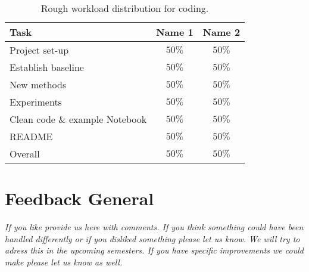 \documentclass[rebuttal]{cvpr}
\begin{document}
\begin{table}
	\begin{center}
		\begin{tabular}{l|c|c}
			
			Task & Name 1 & Name 2 \\
			\hline
			Project set-up & $50\%$ & $50\%$ \\
			Establish baseline & $50\%$ & $50\%$ \\
			New methods & $50\%$ & $50\%$ \\
			Experiments & $50\%$ & $50\%$ \\
			Clean code \& example Notebook & $50\%$ & $50\%$ \\
			README & $50\%$ & $50\%$ \\
			\hline
			\hline
			Overall &$50\%$ & $50\%$ \\
			
		\end{tabular}
	\end{center}
	\caption{Rough workload distribution for coding.}
\end{table}

\section{Feedback General}
\textit{If you like provide us here with comments. If you think something could have been handled differently or if you disliked 
something please let us know. We will try to adress this in the upcoming semesters. If you have specific improvements we 
could make please let us know as well.}


{\small


}
\end{document}
